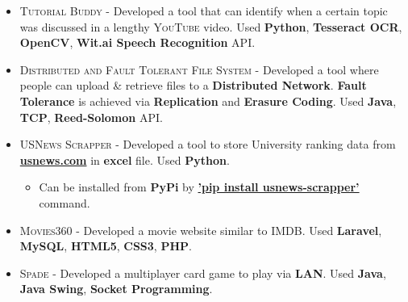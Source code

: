 \documentclass[a4paper,10pt]{article}
\begin{document}
\begin{itemize}
    \item \textsc{Tutorial Buddy} - 
        Developed a tool that can identify when a certain topic was discussed in a lengthy \textsc{YouTube} video. 
        Used \textbf{Python}, \textbf{Tesseract OCR}, \textbf{OpenCV}, \textbf{Wit.ai Speech Recognition} API.
    
    \item \textsc{Distributed and Fault Tolerant File System} - 
        Developed a tool where people can upload \& retrieve files to a \textbf{Distributed Network}. \textbf{Fault Tolerance} is achieved via \textbf{Replication} and \textbf{Erasure Coding}.
        Used \textbf{Java}, \textbf{TCP}, \textbf{Reed-Solomon} API.
    
    
    \item \textsc{USNews Scrapper} - 
        Developed a tool to store University ranking data from \href{https://www.usnews.com/best-graduate-schools}{\textbf{usnews.com}} in \textbf{excel} file. 
        Used \textbf{Python}.
    \begin{itemize}
        \item 
        Can be installed from \textbf{PyPi} by \href{https://github.com/OvroAbir/USNews-Scrapper}{{\normalsize\textbf{'pip install usnews-scrapper'}}} command.
    \end{itemize}
    
    \item \textsc{Movies360} - 
        Developed a movie website similar to \textsc{IMDB}.
        Used \textbf{Laravel}, \textbf{MySQL}, \textbf{HTML5}, \textbf{CSS3}, \textbf{PHP}.
    
    \item \textsc{Spade} - 
        Developed a multiplayer card game to play via \textbf{LAN}.
        Used \textbf{Java}, \textbf{Java Swing}, \textbf{Socket Programming}.
    

\end{itemize}
\end{document}
